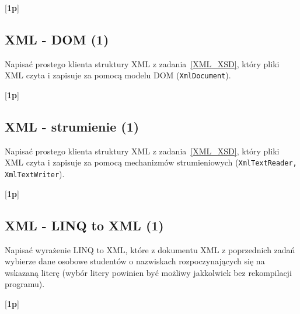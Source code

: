       [{\bf 1p}]

\subsection{XML - DOM (1)}

      Napisać prostego klienta struktury XML z zadania~\ref{XML_XSD}, który pliki XML czyta i zapisuje 
\label{xml_dom}	  
      za pomocą modelu DOM ({\tt XmlDocument}).
      
      [{\bf 1p}]

\subsection{XML - strumienie (1)}

      Napisać prostego klienta struktury XML z zadania~\ref{XML_XSD}, który pliki XML czyta i zapisuje 
\label{xml_strumienie}  
      za pomocą mechanizmów strumieniowych ({\tt XmlTextReader, XmlTextWriter}).
      
      [{\bf 1p}]

\subsection{XML - LINQ to XML (1)}

      Napisać wyrażenie LINQ to XML, które z dokumentu XML z poprzednich zadań wybierze dane osobowe studentów o nazwiskach 
\label{xml_linq}	  
      rozpoczynających się na wskazaną literę (wybór litery powinien być możliwy jakkolwiek bez rekompilacji programu). 
      
      [{\bf 1p}]

